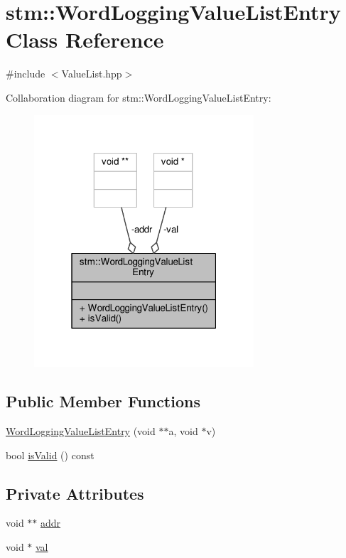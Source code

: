 \hypertarget{classstm_1_1WordLoggingValueListEntry}{\section{stm\-:\-:Word\-Logging\-Value\-List\-Entry Class Reference}
\label{classstm_1_1WordLoggingValueListEntry}
}


{\ttfamily \#include $<$Value\-List.\-hpp$>$}



Collaboration diagram for stm\-:\-:Word\-Logging\-Value\-List\-Entry\-:
\nopagebreak
\begin{figure}[H]
\begin{center}
\leavevmode
\includegraphics[width=232pt]{classstm_1_1WordLoggingValueListEntry__coll__graph}
\end{center}
\end{figure}
\subsection*{Public Member Functions}
\begin{DoxyCompactItemize}
\item 
\hyperlink{classstm_1_1WordLoggingValueListEntry_ad7bf7b5a7343bc7e11b6114b1009d4d0}{Word\-Logging\-Value\-List\-Entry} (void $\ast$$\ast$a, void $\ast$v)
\item 
bool \hyperlink{classstm_1_1WordLoggingValueListEntry_a2b52fd95008f150ec9d6706ec93000c7}{is\-Valid} () const 
\end{DoxyCompactItemize}
\subsection*{Private Attributes}
\begin{DoxyCompactItemize}
\item 
void $\ast$$\ast$ \hyperlink{classstm_1_1WordLoggingValueListEntry_a790d8c297504c4060b96c9e7acb398d4}{addr}
\item 
void $\ast$ \hyperlink{classstm_1_1WordLoggingValueListEntry_aa8106db3ea5806b5109a518adf99dd8a}{val}
\end{DoxyCompactItemize}


